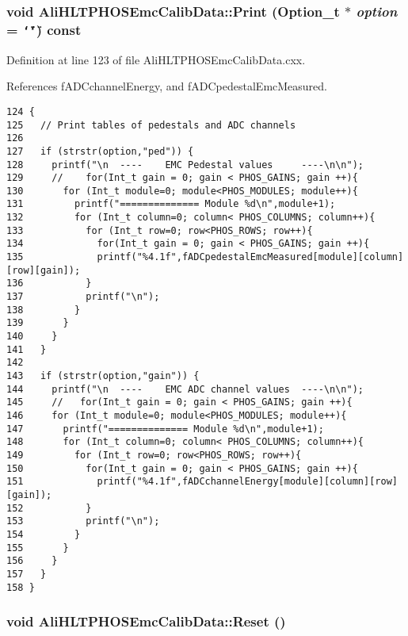 \subsubsection{\setlength{\rightskip}{0pt plus 5cm}void Ali\-HLTPHOSEmc\-Calib\-Data::Print (Option\_\-t $\ast$ {\em option} = {\tt \char`\"{}\char`\"{}}) const\hspace{0.3cm}{\tt  [virtual]}}\label{classAliHLTPHOSEmcCalibData_AliHLTPHOSEmcCalibDataa6}




Definition at line 123 of file Ali\-HLTPHOSEmc\-Calib\-Data.cxx.

References f\-ADCchannel\-Energy, and f\-ADCpedestal\-Emc\-Measured.

\footnotesize\begin{verbatim}124 {
125   // Print tables of pedestals and ADC channels
126 
127   if (strstr(option,"ped")) {
128     printf("\n  ----    EMC Pedestal values     ----\n\n");
129     //    for(Int_t gain = 0; gain < PHOS_GAINS; gain ++){
130       for (Int_t module=0; module<PHOS_MODULES; module++){
131         printf("============== Module %d\n",module+1);
132         for (Int_t column=0; column< PHOS_COLUMNS; column++){
133           for (Int_t row=0; row<PHOS_ROWS; row++){
134             for(Int_t gain = 0; gain < PHOS_GAINS; gain ++){
135             printf("%4.1f",fADCpedestalEmcMeasured[module][column][row][gain]);
136           }
137           printf("\n");
138         }
139       }
140     }
141   }
142 
143   if (strstr(option,"gain")) {
144     printf("\n  ----    EMC ADC channel values  ----\n\n");
145     //   for(Int_t gain = 0; gain < PHOS_GAINS; gain ++){ 
146     for (Int_t module=0; module<PHOS_MODULES; module++){
147       printf("============== Module %d\n",module+1);
148       for (Int_t column=0; column< PHOS_COLUMNS; column++){
149         for (Int_t row=0; row<PHOS_ROWS; row++){
150           for(Int_t gain = 0; gain < PHOS_GAINS; gain ++){ 
151             printf("%4.1f",fADCchannelEnergy[module][column][row][gain]);
152           }
153           printf("\n");
154         }
155       }
156     }  
157   }
158 }
\end{verbatim}\normalsize 


\subsubsection{\setlength{\rightskip}{0pt plus 5cm}void Ali\-HLTPHOSEmc\-Calib\-Data::Reset ()}\label{classAliHLTPHOSEmcCalibData_AliHLTPHOSEmcCalibDataa5}




